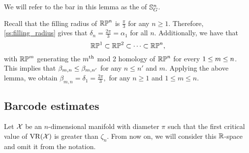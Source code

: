 We will refer to the bar in this lemma as the  of $\mathbb{S}^n_G$.

\example Recall that the filling radius of $\mathbb{RP}^n$ is $\frac{\pi}{3}$ for any $n \geq 1$.
Therefore, \cref{ss:filling_radius} gives that $\delta_n = \tfrac{2\pi}{3} = \alpha_1$ for all $n$.
Additionally, we have that
\[
\mathbb{RP}^1 \subset \mathbb{RP}^2 \subset \dots \subset \mathbb{RP}^n,
\]
with $\mathbb{RP}^m$ generating the $m^{\mathrm{th}}$ mod 2 homology of $\mathbb{RP}^n$ for every $1 \leq m \leq n$.
This implies that $\beta_{m, n} \leq \beta_{m, n'}$ for any $n\leq n'$ and $m$.
Applying the above lemma, we obtain $\beta_{m,n} = \delta_1 = \tfrac{2\pi}{3},$ for any $n\geq 1$ and $1 \leq m \leq n$.

\subsection{Barcode estimates}
\label{subsub:general_barcodes}

Let $\mathcal{X}$ be an $n$-dimensional manifold with diameter $\pi$ such that the first critical value of $\operatorname{VR}(\mathcal{X})$ is greater than $\zeta_n$.
From now on, we will consider this $\mathbb{R}$-space and omit it from the notation.
    

